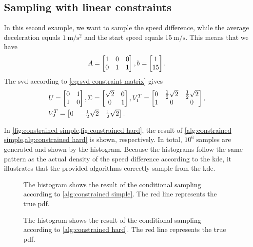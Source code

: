 \subsection{Sampling with linear constraints}

In this second example, we want to sample the speed difference, while the average deceleration equals $\SI{1}{\meter\per\second\squared}$ and the start speed equals $\SI{15}{\meter\per\second}$. 
This means that we have
\begin{equation*}
	A = \begin{bmatrix} 1 & 0 & 0 \\ 0 & 1 & 1 \end{bmatrix}, 
	b = \begin{bmatrix} 1 \\ 15 \end{bmatrix}.
\end{equation*}
The \ac{svd} according to \cref{eq:svd constraint matrix} gives
\begin{align*}
	&U = \begin{bmatrix} 0 & 1 \\ 1 & 0 \end{bmatrix},
	\Sigma = \begin{bmatrix} \sqrt{2} & 0 \\ 0 & 1 \end{bmatrix}, 
	V_1^T = \begin{bmatrix} 0 & \frac{1}{2}\sqrt{2} & \frac{1}{2}\sqrt{2} \\ 1 & 0 & 0 \end{bmatrix},\\
	&V_2^T = \begin{bmatrix} 0 & -\frac{1}{2}\sqrt{2} & \frac{1}{2}\sqrt{2} \end{bmatrix}.
\end{align*}

In \cref{fig:constrained simple,fig:constrained hard}, the result of \cref{alg:constrained simple,alg:constrained hard} is shown, respectively. 
In total, $10^6$ samples are generated and shown by the histogram. 
Because the histograms follow the same pattern as the actual density of the speed difference according to the \ac{kde}, it illustrates that the provided algorithms correctly sample from the \ac{kde}. 

\begin{figure}
	\centering
	\resizebox{\columnwidth}{!}{%
		
	}
	\caption{The histogram shows the result of the conditional sampling according to \cref{alg:constrained simple}. The red line represents the true \ac{pdf}.}
	\label{fig:constrained simple}
\end{figure}

\begin{figure}
	\centering
	\resizebox{\columnwidth}{!}{%
		
	}
	\caption{The histogram shows the result of the conditional sampling according to \cref{alg:constrained hard}. The red line represents the true \ac{pdf}.}
	\label{fig:constrained hard}
\end{figure}

